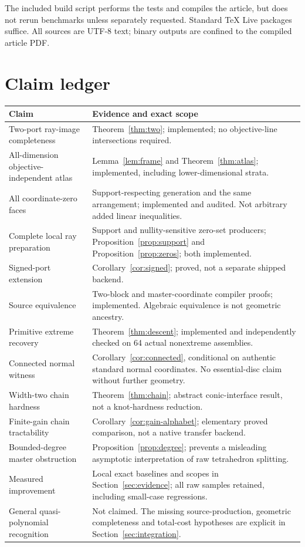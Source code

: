 \documentclass[11pt,a4paper]{article}
\theoremstyle{definition}
\theoremstyle{remark}
\begin{document}
The included build script performs the tests and compiles the article, but does not rerun benchmarks unless separately requested. Standard TeX Live packages suffice. All sources are UTF-8 text; binary outputs are confined to the compiled article PDF.

\section{Claim ledger}
\begin{longtable}{@{}p{}p{}@{}}
\toprule
Claim & Evidence and exact scope\\\midrule\endhead
Two-port ray-image completeness & Theorem~\ref{thm:two}; implemented; no objective-line intersections required.\\
All-dimension objective-independent atlas & Lemma~\ref{lem:frame} and Theorem~\ref{thm:atlas}; implemented, including lower-dimensional strata.\\
All coordinate-zero faces & Support-respecting generation and the same arrangement; implemented and audited. Not arbitrary added linear inequalities.\\
Complete local ray preparation & Support and nullity-sensitive zero-set producers; Proposition~\ref{prop:support} and Proposition~\ref{prop:zeros}; both implemented.\\
Signed-port extension & Corollary~\ref{cor:signed}; proved, not a separate shipped backend.\\
Source equivalence & Two-block and master-coordinate compiler proofs; implemented. Algebraic equivalence is not geometric ancestry.\\
Primitive extreme recovery & Theorem~\ref{thm:descent}; implemented and independently checked on 64 actual nonextreme assemblies.\\
Connected normal witness & Corollary~\ref{cor:connected}, conditional on authentic standard normal coordinates. No essential-disc claim without further geometry.\\
Width-two chain hardness & Theorem~\ref{thm:chain}; abstract conic-interface result, not a knot-hardness reduction.\\
Finite-gain chain tractability & Corollary~\ref{cor:gain-alphabet}; elementary proved comparison, not a native transfer backend.\\
Bounded-degree master obstruction & Proposition~\ref{prop:degree}; prevents a misleading asymptotic interpretation of raw tetrahedron splitting.\\
Measured improvement & Local exact baselines and scopes in Section~\ref{sec:evidence}; all raw samples retained, including small-case regressions.\\
General quasi-polynomial recognition & Not claimed. The missing source-production, geometric completeness and total-cost hypotheses are explicit in Section~\ref{sec:integration}.\\
\bottomrule
\end{longtable}
\end{document}
